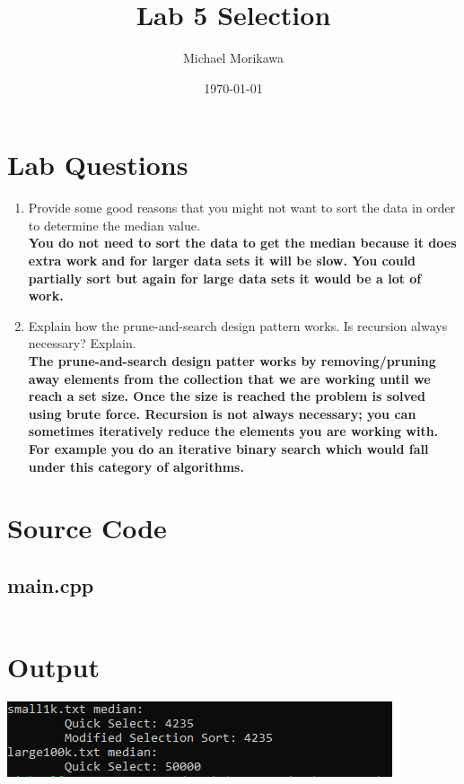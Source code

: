 \documentclass{article}
\title{Lab 5 Selection}
\author{Michael Morikawa}
\date{\today}
\begin{document}
\maketitle
\section{Lab Questions}
\begin{enumerate}[label=\textbf{Question \arabic*}]
    \item Provide some good reasons that you might not want to sort the data in
          order to determine the median value.\\
          \textbf{You do not need to sort the data to get the median because it does extra work
              and for larger data sets it will be slow. You could partially sort but again for large data sets
              it would be a lot of work.}
    \item Explain how the prune-and-search design pattern works. Is recursion
          always necessary? Explain. \\
          \textbf{
              The prune-and-search design patter works by removing/pruning away  elements from
              the collection that we are working until we reach a set size. Once the size is reached
              the problem is solved using brute force. Recursion is not always necessary; you can
              sometimes iteratively reduce the elements you are working with. For example you do
              an iterative binary search which would fall under this category of algorithms.
          }

\end{enumerate}

\section{Source Code}
\subsection{main.cpp}
\inputminted{c++}{../src/main.cpp}
\section{Output}
\includegraphics[]{output.png}
\end{document}
